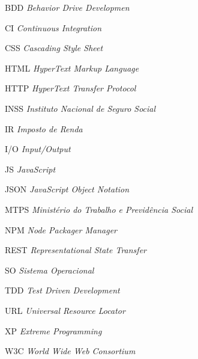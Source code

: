 







\begin{SingleSpace}
\begin{siglas}
 
\item[BDD] \textit{Behavior Drive Developmen}
\item[CI] \textit{Continuous Integration}
\item[CSS] \textit{Cascading Style Sheet}
\item[HTML] \textit{HyperText Markup Language}
\item[HTTP] \textit{HyperText Transfer Protocol}
\item[INSS] \textit{Instituto Nacional de Seguro Social}
\item[IR] \textit{Imposto de Renda}
\item[I/O] \textit{Input/Output}
\item[JS] \textit{JavaScript}
\item[JSON] \textit{JavaScript Object Notation}
\item[MTPS] \textit{Ministério do Trabalho e Previdência Social}
\item[NPM] \textit{Node Packager Manager}
\item[REST] \textit{Representational State Transfer}
\item[SO] \textit{Sistema Operacional}
\item[TDD] \textit{Test Driven Development}
\item[URL]  \textit{Universal Resource Locator}
\item[XP] \textit{Extreme Programming}
\item[W3C] \textit{World Wide Web Consortium}



\end{siglas}

\end{SingleSpace}
